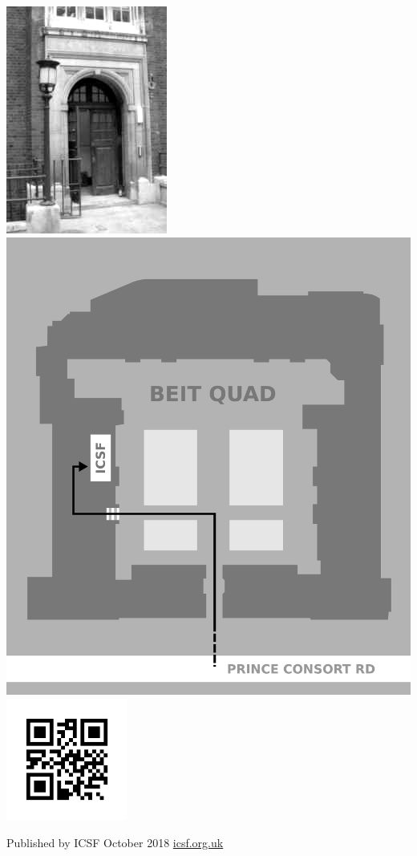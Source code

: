 \thispagestyle{empty}
\vspace*{\fill}
\begin{center}
\includegraphics[height=0.6\textwidth]{img/info/library-door.png}
\hspace{0.2em}
\includegraphics[height=0.6\textwidth]{img/info/beit-map.pdf}
\vfill
\includegraphics[width=0.3\textwidth]{img/info/qr-small.png}

  Published by ICSF October 2018 \textemdash{} \url{icsf.org.uk}
\end{center}
